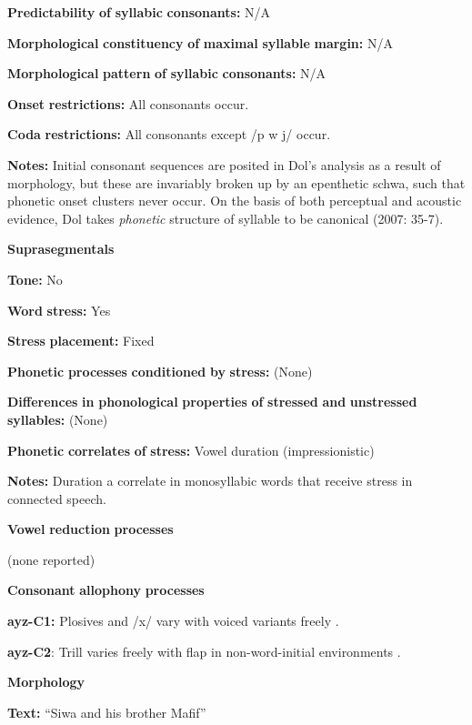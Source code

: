 \begin{styleBody}
\textbf{Predictability} \textbf{of} \textbf{syllabic} \textbf{consonants:} N/A

\textbf{Morphological} \textbf{constituency} \textbf{of} \textbf{maximal} \textbf{syllable} \textbf{margin:} N/A

\textbf{Morphological} \textbf{pattern} \textbf{of} \textbf{syllabic} \textbf{consonants:} N/A

\textbf{Onset} \textbf{restrictions:} All consonants occur.

\textbf{Coda} \textbf{restrictions:} All consonants except /p w j/ occur.

\textbf{Notes:} Initial consonant sequences are posited in Dol’s analysis as a result of morphology, but these are invariably broken up by an epenthetic schwa, such that phonetic onset clusters never occur. On the basis of both perceptual and acoustic evidence, Dol takes \textit{phonetic} structure of syllable to be canonical (2007: 35-7).

\textbf{Suprasegmentals}

\textbf{Tone:} No

\textbf{Word} \textbf{stress:} Yes

\textbf{Stress} \textbf{placement:} Fixed

\textbf{Phonetic} \textbf{processes} \textbf{conditioned} \textbf{by} \textbf{stress:} (None)

\textbf{Differences} \textbf{in} \textbf{phonological} \textbf{properties} \textbf{of} \textbf{stressed} \textbf{and} \textbf{unstressed} \textbf{syllables:} (None)

\textbf{Phonetic} \textbf{correlates} \textbf{of} \textbf{stress:} Vowel duration (impressionistic)

\textbf{Notes:} Duration a correlate in monosyllabic words that receive stress in connected speech.

\textbf{Vowel} \textbf{reduction} \textbf{processes}

(none reported)

\textbf{Consonant} \textbf{allophony} \textbf{processes}

\textbf{ayz-C1:} Plosives and /x/ vary with voiced variants freely \citep[21-2]{Dol2007}.

\textbf{ayz-C2}: Trill varies freely with flap in non-word-initial environments \citep[24]{Dol2007}.

\textbf{Morphology}

\textbf{Text:} “Siwa and his brother Mafif” \citep[284-291]{Dol2007}


\end{styleBody}
